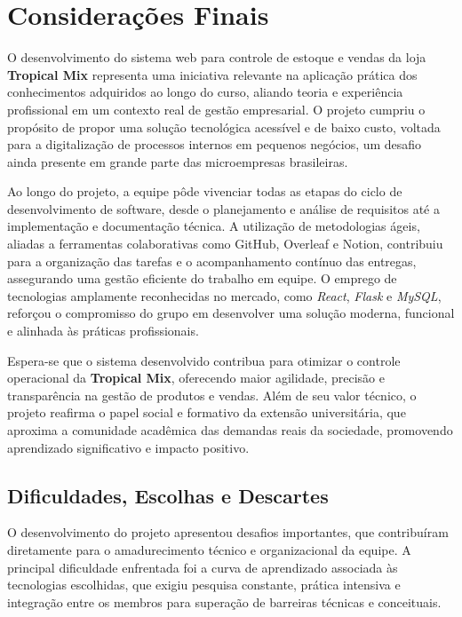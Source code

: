 \chapter{Considerações Finais}

O desenvolvimento do sistema web para controle de estoque e vendas da loja \textbf{Tropical Mix} representa uma iniciativa relevante na aplicação prática dos conhecimentos adquiridos ao longo do curso, aliando teoria e experiência profissional em um contexto real de gestão empresarial. O projeto cumpriu o propósito de propor uma solução tecnológica acessível e de baixo custo, voltada para a digitalização de processos internos em pequenos negócios, um desafio ainda presente em grande parte das microempresas brasileiras.

Ao longo do projeto, a equipe pôde vivenciar todas as etapas do ciclo de desenvolvimento de software, desde o planejamento e análise de requisitos até a implementação e documentação técnica. A utilização de metodologias ágeis, aliadas a ferramentas colaborativas como GitHub, Overleaf e Notion, contribuiu para a organização das tarefas e o acompanhamento contínuo das entregas, assegurando uma gestão eficiente do trabalho em equipe. O emprego de tecnologias amplamente reconhecidas no mercado, como \textit{React}, \textit{Flask} e \textit{MySQL}, reforçou o compromisso do grupo em desenvolver uma solução moderna, funcional e alinhada às práticas profissionais.

Espera-se que o sistema desenvolvido contribua para otimizar o controle operacional da \textbf{Tropical Mix}, oferecendo maior agilidade, precisão e transparência na gestão de produtos e vendas. Além de seu valor técnico, o projeto reafirma o papel social e formativo da extensão universitária, que aproxima a comunidade acadêmica das demandas reais da sociedade, promovendo aprendizado significativo e impacto positivo.

\section{Dificuldades, Escolhas e Descartes}

O desenvolvimento do projeto apresentou desafios importantes, que contribuíram diretamente para o amadurecimento técnico e organizacional da equipe. A principal dificuldade enfrentada foi a curva de aprendizado associada às tecnologias escolhidas, que exigiu pesquisa constante, prática intensiva e integração entre os membros para superação de barreiras técnicas e conceituais.

